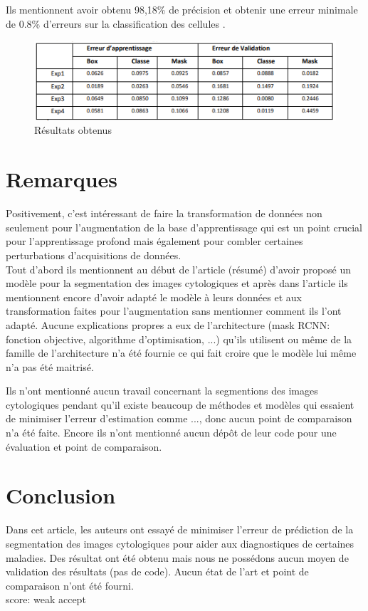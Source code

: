 \documentclass[french]{report}
\begin{document}
Ils mentionnent avoir obtenu  98,18\% de précision et obtenir une erreur minimale de 0.8\% d'erreurs sur la classification des cellules .
\begin{figure}[H]
	\centering
	\includegraphics{images/rapport_2.PNG}
	\caption{Résultats obtenus}
	\label{comb}
\end{figure} 

\section*{Remarques}
Positivement, c'est intéressant de faire la transformation de données non seulement pour l'augmentation de la base d'apprentissage qui est un point crucial pour l'apprentissage profond mais également pour combler certaines perturbations d'acquisitions de données.\\

Tout d'abord ils mentionnent au début de l'article (résumé) d'avoir proposé un modèle pour la segmentation des images cytologiques et après dans l'article ils mentionnent encore d'avoir adapté le modèle à leurs données et aux transformation faites pour l'augmentation sans mentionner comment ils l'ont adapté. Aucune explications propres a eux de l'architecture (mask RCNN: fonction objective, algorithme d'optimisation, ...) qu'ils utilisent ou même de la famille de l'architecture n'a été fournie ce qui fait croire que le modèle lui même n'a pas été maitrisé. 

Ils n'ont mentionné aucun travail concernant la segmentions des images cytologiques pendant qu'il existe beaucoup de méthodes et modèles qui essaient de minimiser l'erreur d'estimation comme \cite{ref1, ref2} ..., donc aucun point de comparaison n'a été faite. Encore ils n'ont mentionné aucun dépôt de leur code pour une évaluation et point de comparaison.  

\section*{Conclusion}
Dans cet article, les auteurs ont essayé de minimiser l'erreur de prédiction de la segmentation des images cytologiques pour aider aux diagnostiques de certaines maladies. Des résultat ont été obtenu mais nous ne possédons aucun moyen de validation des résultats (pas de code). Aucun état de l'art  et point de comparaison n'ont été fourni. \\

\hfill score: weak accept

\printbibliography
\end{document}
